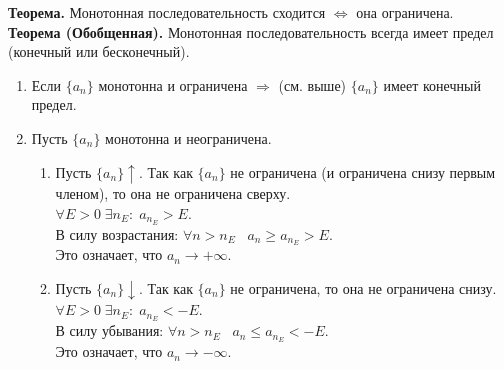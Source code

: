 \textbf{Теорема.} Монотонная последовательность сходится $\Leftrightarrow$ она ограничена. \\
\textbf{Теорема (Обобщенная).} Монотонная последовательность всегда имеет предел (конечный или бесконечный).

\begin{tcolorbox}[title=Доказательство (общий случай)]
	\begin{enumerate}
		\item Если $\{a_n\}$ монотонна и ограничена $\Rightarrow$ (см. выше) $\{a_n\}$ имеет конечный предел.
		\item Пусть $\{a_n\}$ монотонна и неограничена.
			\begin{enumerate}
				\item Пусть $\{a_n\} \uparrow$. Так как $\{a_n\}$ не ограничена (и ограничена снизу первым членом), то она не ограничена сверху.\\
				$\forall E > 0 \; \exists n_E:\; a_{n_E} > E$. \\
				В силу возрастания: $\forall n > n_E \;\;\; a_n \geq a_{n_E} > E$. \\
				Это означает, что $a_n \to +\infty$.
				
				\item Пусть $\{a_n\} \downarrow$. Так как $\{a_n\}$ не ограничена, то она не ограничена снизу.\\
				$\forall E > 0 \; \exists n_E:\; a_{n_E} < -E$. \\
				В силу убывания: $\forall n > n_E \;\;\; a_n \leq a_{n_E} < -E$. \\
				Это означает, что $a_n \to -\infty$.
			\end{enumerate}
	\end{enumerate}
\end{tcolorbox}
